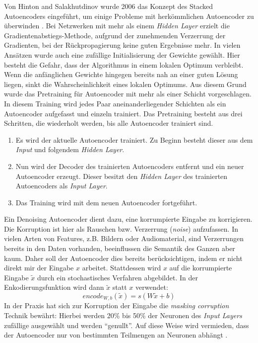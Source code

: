 Von Hinton and Salakhutdinov wurde 2006 das Konzept des Stacked Autoencoders eingeführt, um einige Probleme mit herkömmlichen Autoencoder zu überwinden \cite{dae2006}. Bei Netzwerken mit mehr als einem \textit{Hidden Layer} erzielt die Gradientenabstiegs-Methode, aufgrund der zunehmenden Verzerrung der Gradienten, bei der Rückpropagierung keine guten Ergebnisse mehr. In vielen Ansätzen wurde auch eine zufällige Initialisierung der Gewichte gewählt. Hier besteht die Gefahr, dass der Algorithmus in einem lokalen Optimum verbleibt. Wenn die anfänglichen Gewichte hingegen bereits nah an einer guten Lösung liegen, sinkt die Wahrscheinlichkeit eines lokalen Optimums. Aus diesem Grund wurde das Pretraining für Autoencoder mit mehr als einer Schicht vorgeschlagen. In diesem Training wird jedes Paar aneinanderliegender Schichten als ein Autoencoder aufgefasst und einzeln trainiert. Das Pretraining besteht aus drei Schritten, die wiederholt werden, bis alle Autoencoder trainiert sind.

\begin{enumerate}
	\item Es wird der aktuelle Autoencoder trainiert. Zu Beginn besteht dieser aus dem \textit{Input} und folgendem \textit{Hidden Layer}.
	\item Nun wird der Decoder des trainierten Autoencoders entfernt und ein neuer Autoencoder erzeugt. Dieser besitzt den \textit{Hidden Layer} des trainierten Autoencoders als \textit{Input Layer}.
	\item Das Training wird mit dem neuen Autoencoder fortgeführt.
\end{enumerate}

Ein Denoising Autoencoder \cite{sda2010} dient dazu, eine korrumpierte Eingabe zu korrigieren. Die Korruption ist hier als Rauschen bzw. Verzerrung (\textit{noise}) aufzufassen. In vielen Arten von Features, z.B. Bildern oder Audiomaterial, sind Verzerrungen bereits in den Daten vorhanden, beeinflussen die Semantik des Ganzen aber kaum. Daher soll der Autoencoder dies bereits berücksichtigen, indem er nicht direkt mir der Eingabe $x$ arbeitet. Stattdessen wird $x$ auf die korrumpierte Eingabe $\widetilde{x}$ durch ein stochastisches Verfahren abgebildet. In der Enkodierungsfunktion wird dann $\widetilde{x}$ statt $x$ verwendet: 
$$encode_{W,b}(\widetilde{x}) = s(W\widetilde{x} + b)$$
In der Praxis hat sich zur Korruption der Eingabe die \textit{masking corruption} Technik bewährt: Hierbei werden 20\% bis 50\% der Neuronen des \textit{Input Layers} zufällige ausgewählt und werden \enquote{genullt}. Auf diese Weise wird vermieden, dass der Autoencoder nur von bestimmten Teilmengen an Neuronen abhängt  \cite{pda2012}.


